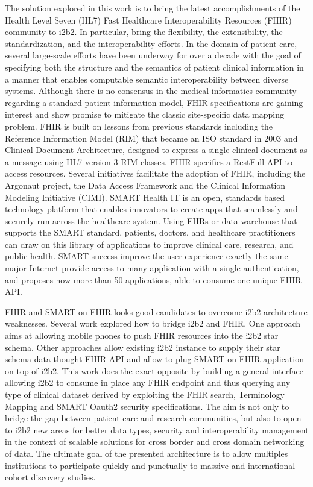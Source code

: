\documentclass{amia}
\newcommand{\remXavier}[1]{\todo[color=yellow]{[XT]{\scriptsize #1\par}}}
\newcommand{\remNico}[1]{\todo[color=orange]{[NP]{\scriptsize #1\par}}}
\begin{document}
The solution explored in this work is to bring the latest accomplishments of the Health Level Seven (HL7) Fast Healthcare Interoperability Resources (FHIR) community to i2b2. In particular, bring the flexibility, the extensibility, the standardization, and the interoperability efforts. In the domain of patient care, several large-scale efforts have been underway for over a decade with the goal of specifying both the structure and the semantics of patient clinical information in a manner that enables computable semantic interoperability between diverse systems. Although there is no consensus in the medical informatics community regarding a standard patient information model, FHIR specifications are gaining interest and show promise to mitigate the classic site-specific data mapping problem. FHIR is built on lessons\cite{ref10} from previous standards including the Reference Information Model (RIM) that became an ISO standard in 2003 and Clinical Document Architecture, designed to express a single clinical document as a message using HL7 version 3 RIM classes. FHIR specifies a RestFull API to access resources. Several initiatives facilitate the adoption of FHIR, including the Argonaut project\cite{ref11}, the Data Access Framework\cite{ref12} and the Clinical Information Modeling Initiative (CIMI)\cite{cimi}. 
SMART Health IT is an open, standards based technology platform that enables innovators to create apps that seamlessly and securely run across the healthcare system. Using EHRs or data warehouse that supports the SMART standard, patients, doctors, and healthcare practitioners can draw on this library of applications to improve clinical care, research, and public health. SMART success improve the user experience exactly the same major Internet provide access to many application with a single authentication, and proposes now more than 50 applications, able to consume one unique FHIR-API.

FHIR and SMART-on-FHIR looks good candidates to overcome i2b2 architecture weaknesses. Several work explored how to bridge i2b2 and FHIR. One approach\cite{apple} aims at allowing mobile phones to push FHIR resources into the i2b2 star schema. Other approaches\cite{wag,zappy} allow existing i2b2 instance to supply their star schema data thought FHIR-API and allow to plug SMART-on-FHIR application on top of i2b2. This work does the exact opposite by building a general interface allowing i2b2 to consume in place any FHIR endpoint and thus querying any type of clinical dataset derived by exploiting the FHIR search, Terminology Mapping\cite{FHIR} and SMART Oauth2 security\cite{SMARTFHIR} specifications. The aim is not only to bridge the gap between patient care and research communities, but also to open to i2b2 new areas for better data types, security and interoperability management in the context of scalable solutions for cross border and cross domain networking of data. The ultimate goal of the presented architecture is to allow multiples institutions to participate quickly and punctually to massive and international cohort discovery studies.
\end{document}
